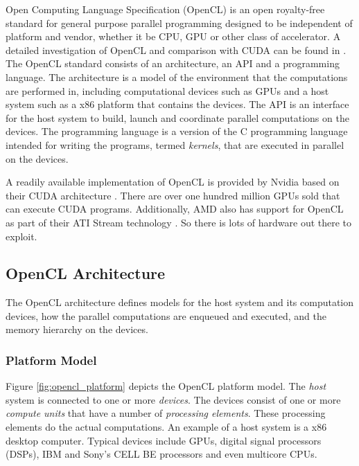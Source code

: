 Open Computing Language Specification (OpenCL) is an open royalty-free standard for general purpose parallel programming \cite{openclspec} designed to be independent of platform and vendor, whether it be CPU, GPU or other class of accelerator. A detailed investigation of OpenCL and comparison with CUDA can be found in \cite{fagerlund2008}. The OpenCL standard consists of an architecture, an API and a programming language. The architecture is a model of the environment that the computations are performed in, including computational devices such as GPUs and a host system such as a x86 platform that contains the devices. The API is an interface for the host system to build, launch and coordinate parallel computations on the devices. The programming language is a version of the C programming language intended for writing the programs, termed \emph{kernels}, that are executed in parallel on the devices.

A readily available implementation of OpenCL is provided by Nvidia based on their CUDA architecture \cite{cudaprogguide}. There are over one hundred million GPUs sold that can execute CUDA programs. Additionally, AMD also has support for OpenCL as part of their ATI Stream technology \cite{streamreleasenotes}. So there is lots of hardware out there to exploit.

\subsection{OpenCL Architecture}

	The OpenCL architecture defines models for the host system and its computation devices, how the parallel computations are enqueued and executed, and the memory hierarchy on the devices.

	\subsubsection{Platform Model}
	
		Figure \ref{fig:opencl_platform} depicts the OpenCL platform model. The \emph{host} system is connected to one or more \emph{devices}. The devices consist of one or more \emph{compute units} that have a number of \emph{processing elements}. These processing elements do the actual computations. An example of a host system is a x86 desktop computer. Typical devices include GPUs, digital signal processors (DSPs), IBM and Sony's CELL BE processors and even multicore CPUs.
	
